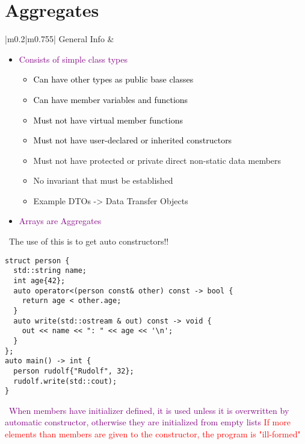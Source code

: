 \documentclass[main.tex,fontsize=8pt,paper=a4,paper=portrait,DIV=calc]{scrartcl}
\begin{document}
\begin{table}[ht!]
\section{Aggregates}
\begin{tabular}{|m{0.2\linewidth}|m{0.755\linewidth}|}
\hline
General Info &
\vspace{2mm}
\begin{itemize}
\item \textcolor{purple}{Consists of simple class types}\newline
  \begin{itemize}
  \item \textcolor{black}{Can have other types as public base classes}
  \item \textcolor{black}{Can have member variables and functions}
  \item \textcolor{black}{Must not have virtual member functions}
  \item \textcolor{black}{Must not have user-declared or inherited constructors}
  \item Must not have protected or private direct non-static data members
  \item No invariant that must be established
  \item Example DTOs -> Data Transfer Objects
  \end{itemize} 
\item \textcolor{purple}{Arrays are Aggregates}
\vspace{-3mm}
\end{itemize}
\, \newline
The use of this is to get auto constructors!! \newline
\begin{lstlisting}
struct person {
  std::string name;
  int age{42};
  auto operator<(person const& other) const -> bool {
    return age < other.age;
  }
  auto write(std::ostream & out) const -> void {
    out << name << ": " << age << '\n';
  }
};
auto main() -> int {
  person rudolf{"Rudolf", 32};
  rudolf.write(std::cout);
}
\end{lstlisting}
\, \newline
\textcolor{purple}{When members have initializer defined, it is used unless it is overwritten by automatic constructor, otherwise they are initialized from empty lists}\newline
\textcolor{red}{If more elements than members are given to the constructor, the program is "ill-formed"}\\
\hline
\end{tabular}

\end{table}
\end{document}
